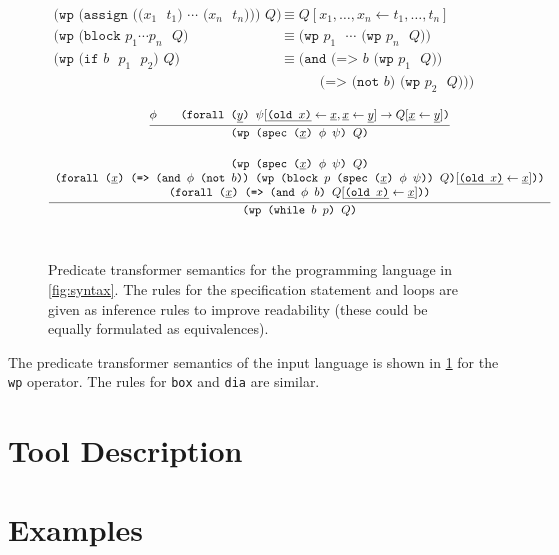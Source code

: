 \documentclass[fleqn]{llncs}
\newcommand{\code}[1]{\texttt{#1}}
\newcommand{\xs}{\underline x}
\newcommand{\ys}{\underline y}
\begin{document}
\begin{figure}
    \begin{align*}
\code{(wp (assign (($x_1$ $t_1$) $\cdots$ ($x_n$ $t_n$))) $Q$)}
    & \equiv Q[x_1,\ldots,x_n \gets t_1,\ldots,t_n]
    \\
\code{(wp (block $p_1 \cdots p_n$ $Q$)}
    & \equiv \code{(wp $p_1$ $\cdots$ (wp $p_n$ $Q$))}
    \\
\code{(wp (if $b$ $p_1$ $p_2$) $Q$)}
    & \equiv        \code{(and (=> $b$ (wp $p_1$ $Q$))} \\
    & \hspace{30pt} \code{     (=> (not $b$) (wp $p_2$ $Q$)))}
    \end{align*}

    \begin{gather*}
\infer{\code{(wp (spec ($\xs$) $\phi$ $\psi$) $Q$)}}
{   \phi
 && \code{(forall ($\ys$) $\psi[\underline{\code{(old $x$)}} \gets \xs, \xs \gets \ys]
                            \to Q[\xs \gets \ys]$)}
              }
    \\[1em]
\infer{\code{(wp (while $b$ $p$) $Q$)}}
{   
\begin{array}{c}
   \code{(wp (spec ($\xs$) $\phi$ $\psi$) $Q$)} \\
   \code{(forall ($\xs$) (=> (and $\phi$ (not $b$)) (wp (block $p$ (spec ($\xs$) $\phi$ $\psi$)) $Q$)$[\underline{\code{(old $x$)}} \gets \xs]$))} \\
   \code{(forall ($\xs$) (=> (and $\phi$ $b$) $Q[\underline{\code{(old $x$)}} \gets \xs]$))}
\end{array}}
    \end{gather*}
    \\
        \qquad {}
    \label{fig:semantics}
    \caption{Predicate transformer semantics for the programming language in \cref{fig:syntax}.
             The rules for the specification statement and loops are given as inference rules
             to improve readability (these could be equally formulated as equivalences).}
\end{figure}

The predicate transformer semantics of the input language is shown in \cref{fig:semantics} for the \code{wp} operator.
The rules for \code{box} and \code{dia} are similar.

\section{Tool Description}
\label{sec:tool}

\section{Examples}
\end{document}
